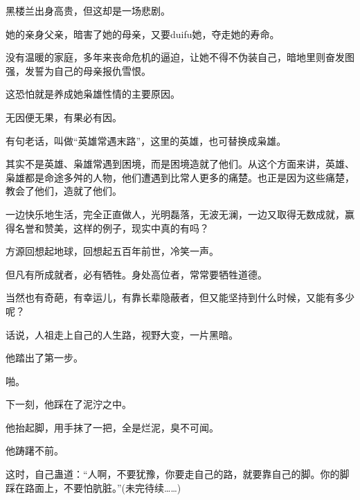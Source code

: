 \begin{this_body}
黑楼兰出身高贵，但这却是一场悲剧。

她的亲身父亲，暗害了她的母亲，又要duifu她，夺走她的寿命。

没有温暖的家庭，多年来丧命危机的逼迫，让她不得不伪装自己，暗地里则奋发图强，发誓为自己的母亲报仇雪恨。

这恐怕就是养成她枭雄性情的主要原因。

无因便无果，有果必有因。

有句老话，叫做“英雄常遇末路”，这里的英雄，也可替换成枭雄。

其实不是英雄、枭雄常遇到困境，而是困境造就了他们。从这个方面来讲，英雄、枭雄都是命途多舛的人物，他们遭遇到比常人更多的痛楚。也正是因为这些痛楚，教会了他们，造就了他们。

一边快乐地生活，完全正直做人，光明磊落，无波无澜，一边又取得无数成就，赢得名誉和赞美，这样的例子，现实中真的有吗？

方源回想起地球，回想起五百年前世，冷笑一声。

但凡有所成就者，必有牺牲。身处高位者，常常要牺牲道德。

当然也有奇葩，有幸运儿，有靠长辈隐蔽者，但又能坚持到什么时候，又能有多少呢？

话说，人祖走上自己的人生路，视野大变，一片黑暗。

他踏出了第一步。

啪。

下一刻，他踩在了泥泞之中。

他抬起脚，用手抹了一把，全是烂泥，臭不可闻。

他踌躇不前。

这时，自己蛊道：“人啊，不要犹豫，你要走自己的路，就要靠自己的脚。你的脚踩在路面上，不要怕肮脏。”(未完待续……)

\end{this_body}

